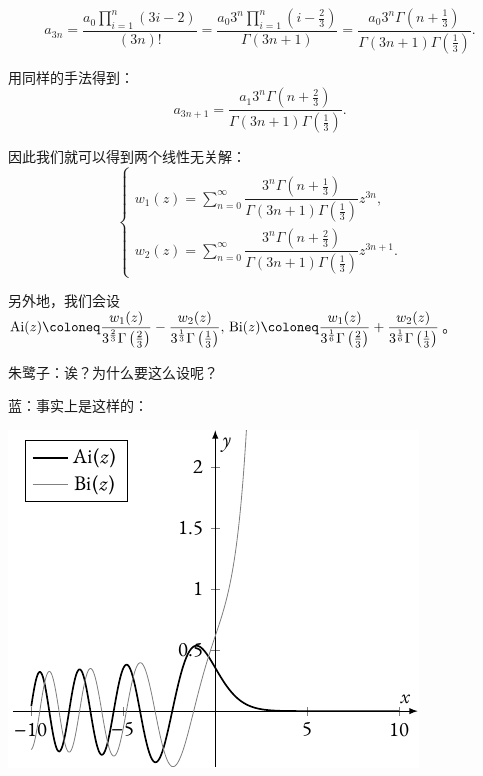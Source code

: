 \begin{tcolorbox}[colback=gray!20,colframe=gray!150,fonttitle=\bfseries,arc=0mm,leftrule=1mm,toprule=0mm,bottomrule=0mm,rightrule=0mm,breakable]
	\[
		a_{3n}=\frac{a_0\prod_{i=1}^{n} (3i-2)}{(3n)!} = \frac{a_0 3^n\prod_{i=1}^{n} \left( i-\frac{2}{3} \right) }{\Gamma (3n+1)}=
		\frac{a_0 3^n \Gamma \left( n+\frac{1}{3} \right)  }{\Gamma (3n+1)\Gamma \left( \frac{1}{3} \right) }
		.\]

	用同样的手法得到：
	\[
		a_{3n+1}=	\frac{a_1 3^n \Gamma \left( n+\frac{2}{3} \right)  }{\Gamma (3n+1)\Gamma \left( \frac{1}{3} \right) }
		.\]

	因此我们就可以得到两个线性无关解：
	\[
		\begin{cases}
			\\[-2.2em]
			w_1(z)= \sum_{n=0}^{\infty} 	\dfrac{3^n \Gamma \left( n+\frac{1}{3} \right)  }{\Gamma (3n+1)\Gamma \left( \frac{1}{3} \right) } z^{3n}, \\[6pt]
			w_2(z)=\sum_{n=0}^{\infty}  \dfrac{3^n \Gamma \left( n+\frac{2}{3} \right)  }{\Gamma (3n+1)\Gamma \left( \frac{1}{3} \right) } z^{3n+1}.
		\end{cases}
	\]

	另外地，我们会设 \(\Ai(z)\coloneq\dfrac{w_1(z)}{3^{\frac{2}{3}} \Gamma \left(\frac{2}{3}\right)}-\dfrac{w_2(z)}{3^{\frac{1}{3}} \Gamma \left(\frac{1}{3}\right)},\,\Bi(z)\coloneq \dfrac{w_1(z)}{3^{\frac{1}{6}}\Gamma \left( \frac{2}{3} \right) }+\dfrac{w_2(z)}{3^{\frac{1}{6}}\Gamma \left( \frac{1}{3} \right) }\)。
\end{tcolorbox}

朱鹭子：诶？为什么要这么设呢？

蓝：事实上是这样的：

\begin{center}
	\includegraphics[]{Ai and Bi func.pdf}
\end{center}

